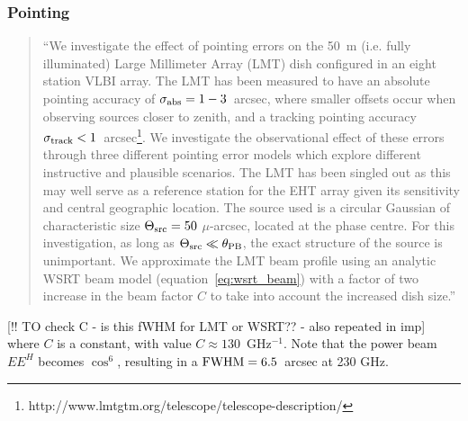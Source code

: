 

\subsubsection{Pointing}

\begin{quotation}
``We investigate the effect of pointing errors on the 50~m (i.e. fully illuminated) Large Millimeter Array (LMT) dish configured in an eight station VLBI array. The LMT has been measured to have an absolute pointing accuracy of $\sigma_{\rm abs} = 1-3$~arcsec, where smaller offsets occur when observing sources closer to zenith, and a tracking pointing accuracy $\sigma_{\rm track} < 1$~arcsec\footnote{http://www.lmtgtm.org/telescope/telescope-description/}. We investigate the observational effect of these errors through three different pointing error models which explore different instructive and plausible scenarios. The LMT has been singled out as this may well serve as a reference station for the EHT array given its sensitivity and central geographic location. The source used is a circular Gaussian of characteristic size $\Theta_{\rm src}=50$ $\mu$-arcsec, located at the phase centre. For this investigation, as long as $\Theta_{\rm src} \ll \theta_{\rm PB}$, the exact structure of the source is unimportant. We approximate the LMT beam profile using an analytic WSRT beam model (equation~\ref{eq:wsrt_beam}) with a factor of two increase in the beam factor $C$ to take into account the increased dish size.''\\
\citep{Blecher_2016}
\end{quotation}

[!! TO check C - is this fWHM for LMT or WSRT?? - also repeated in imp]
where $C$ is a constant, with value $C \approx 130$~GHz$^{-1}$. Note that the power beam $EE^H$ becomes $\cos^6$, resulting in a $\rm{FWHM} = 6.5 $~arcsec at 230 GHz. 



